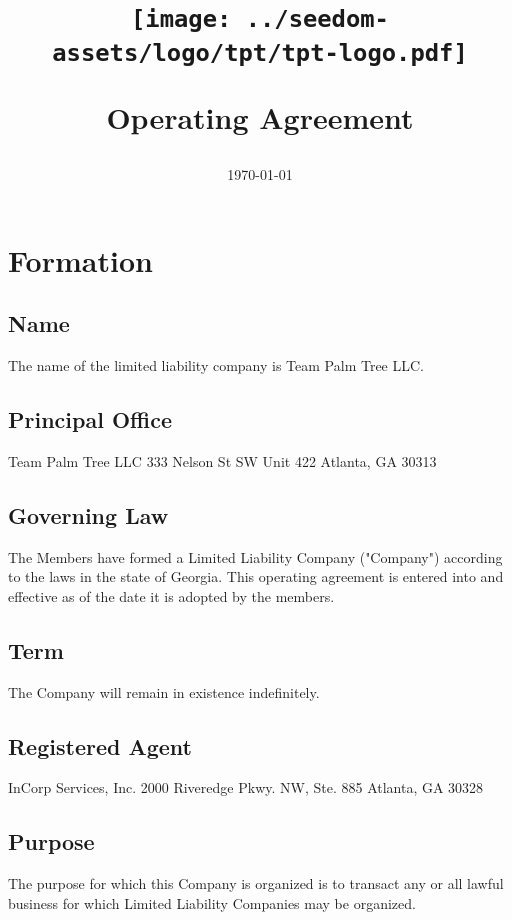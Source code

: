 \documentclass[11pt]{article}
\begin{document}
\title{%
\begin{center}
\texttt{[image: ../seedom-assets/logo/tpt/tpt-logo.pdf]}
\end{center}
\huge Operating Agreement \\[1mm]}
\date{\today}
\maketitle
\pagebreak

\tableofcontents
\pagebreak

\section{Formation}

\subsection{Name}
The name of the limited liability company is Team Palm Tree LLC.

\subsection{Principal Office}
Team Palm Tree LLC
333 Nelson St SW
Unit 422
Atlanta, GA 30313

\subsection{Governing Law}
The Members have formed a Limited Liability Company ("Company") according to the laws in the state of Georgia. This operating agreement is entered into and effective as of the date it is adopted by the members.

\subsection{Term}
The Company will remain in existence indefinitely.

\subsection{Registered Agent}
InCorp Services, Inc.
2000 Riveredge Pkwy. NW, Ste. 885
Atlanta, GA 30328

\subsection{Purpose}
The purpose for which this Company is organized is to transact any or all lawful business for which Limited Liability Companies may be organized.
\end{document}
